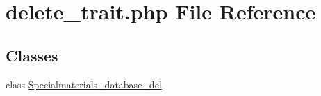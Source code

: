 \hypertarget{delete__trait_8php}{\section{delete\+\_\+trait.\+php File Reference}
\label{delete__trait_8php}
}
\subsection*{Classes}
\begin{DoxyCompactItemize}
\item 
class \hyperlink{classSpecialmaterials__database__del}{Specialmaterials\+\_\+database\+\_\+del}
\end{DoxyCompactItemize}
